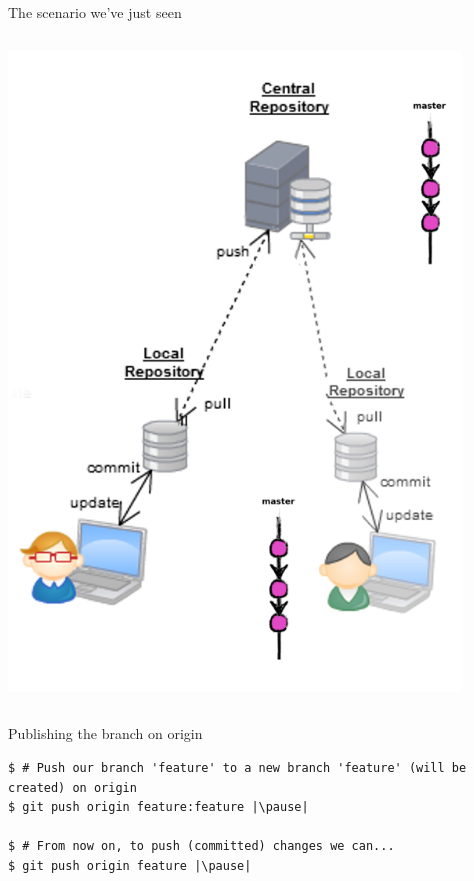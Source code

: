 \begin{frame}[fragile]{The scenario we've just seen}
\begin{columns}
\begin{column}{0.4\textwidth}
\begin{center}
{			}\only<8> {
				\includegraphics[width=0.9\textwidth]{branch_many.png}
			}
	\end{center}
\end{column}
\end{columns}

\end{frame}
\begin{frame}[fragile]{Publishing the branch on origin}
	\begin{lstlisting}
$ # Push our branch 'feature' to a new branch 'feature' (will be created) on origin
$ git push origin feature:feature |\pause|

$ # From now on, to push (committed) changes we can...
$ git push origin feature |\pause|
	\end{lstlisting}
\end{frame}

